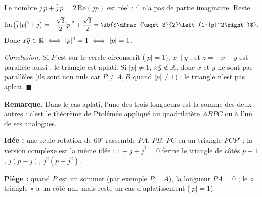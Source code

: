 \begin{enumerate}[itemsep=14pt]
\begin{enumerate}[itemsep=8pt]
    Le nombre $j\,p+\bar j\,\bar p=2\,\mathrm{Re}(jp)$ est réel : il n'a pas de partie imaginaire. Reste
    \[\mathrm{Im}\left(\bar j\,|p|^2+j\right)=-\dfrac{\sqrt3}{2}|p|^2+\dfrac{\sqrt3}{2}=\ib{$\dfrac{\sqrt3}{2}\left(1-|p|^2\right)$}.\]
    Donc $x\bar y\in\mathbb{R}\iff|p|^2=1\iff|p|=1$.

    \emph{Conclusion.} Si $P$ est sur le cercle circonscrit ($|p|=1$), $x\parallel y$ ; et $z=-x-y$ est parallèle aussi : le triangle est aplati. Si $|p|\neq1$, $x\bar y\notin\mathbb{R}$, donc $x$ et $y$ ne sont pas parallèles (ils sont non nuls car $P\neq A,B$ quand $|p|\neq1$) : le triangle n'est pas aplati. $\blacksquare$
  \end{enumerate}
\end{enumerate}

\textbf{Remarque.} Dans le cas aplati, l'une des trois longueurs est la somme des deux autres : c'est le théorème de Ptolémée appliqué au quadrilatère $ABPC$ ou à l'un de ses analogues.

\textbf{Idée :} une seule rotation de $60^\circ$ rassemble $PA$, $PB$, $PC$ en un triangle $PCP'$ ; la version complexe est la même idée : $1+j+j^2=0$ ferme le triangle de côtés $p-1$, $j(p-j)$, $j^2(p-j^2)$.

\textbf{Piège :} quand $P$ est un sommet (par exemple $P=A$), la longueur $PA=0$ ; le « triangle » a un côté nul, mais reste un cas d'aplatissement ($|p|=1$).
